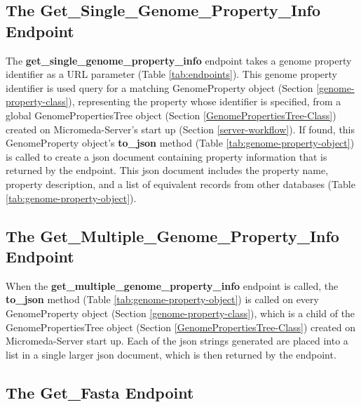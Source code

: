\subsection{The Get\_Single\_Genome\_Property\_Info Endpoint} \label{get-property-info-endpoint}

The \textbf{get\_single\_genome\_property\_info} endpoint takes a genome property identifier as a URL parameter (Table \ref{tab:endpoints}). This genome property identifier is used query for a matching GenomeProperty object (Section \ref{genome-property-class}), representing the property whose identifier is specified, from a global GenomePropertiesTree object (Section \ref{GenomePropertiesTree-Class}) created on Micromeda-Server's start up (Section \ref{server-workflow}). If found, this GenomeProperty object's \textbf{to\_json} method (Table \ref{tab:genome-property-object}) is called to create a \gls{json} document containing property information that is returned by the endpoint. This \gls{json} document includes the property name, property description, and a list of equivalent records from other databases (Table \ref{tab:genome-property-object}).

\subsection{The Get\_Multiple\_Genome\_Property\_Info Endpoint}

When the \textbf{get\_multiple\_genome\_property\_info} endpoint is called, the \textbf{to\_json} method (Table \ref{tab:genome-property-object}) is called on every GenomeProperty object (Section \ref{genome-property-class}), which is a child of the GenomePropertiesTree object (Section \ref{GenomePropertiesTree-Class}) created on Micromeda-Server start up. Each of the \gls{json} strings generated are placed into a list in a single larger \gls{json} document, which is then returned by the endpoint. 

\subsection{The Get\_Fasta Endpoint} \label{get-fasta-endpoint}

